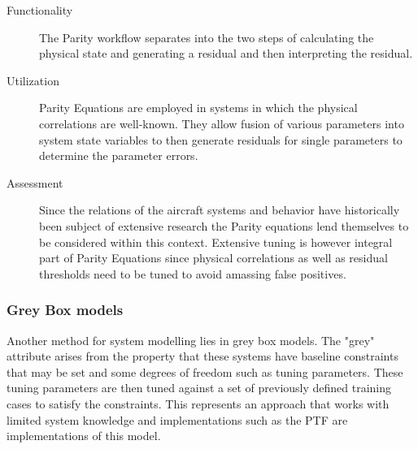 \begin{description}
    \item[Functionality]\hfill

    The Parity workflow separates into the two steps of calculating the physical state and generating a residual and then interpreting the residual.

    \item[Utilization]\hfill

    Parity Equations are employed in systems in which the physical correlations are well-known. They allow fusion of various parameters into system state variables to then generate residuals for single parameters to determine the parameter errors.

    \item[Assessment]\hfill

    Since the relations of the aircraft systems and behavior have historically been subject of extensive research the Parity equations lend themselves to be considered within this context. Extensive tuning is however integral part of Parity Equations since physical correlations as well as residual thresholds need to be tuned to avoid amassing false positives.
\end{description}

\subsubsection{Grey Box models}

Another method for system modelling lies in grey box models. The "grey" attribute arises from the property that these systems have baseline constraints that may be set and some degrees of freedom such as tuning parameters. These tuning parameters are then tuned against a set of previously defined training cases to satisfy the constraints. This represents an approach that works with limited system knowledge and implementations such as the PTF are implementations of this model. \cite{isermann_fault-diagnosis_2006}





